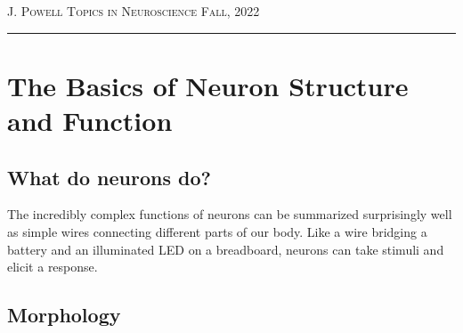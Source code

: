 \documentclass[12pt]{amsart}
\begin{document}
\bigskip
\bigskip
\bigskip
\bigskip
{}

\pagebreak




{\scshape J. Powell} \hfill {\scshape \large Topics in Neuroscience} \hfill {\scshape Fall, 2022}
 
\smallskip

\hrule
\bigskip
\normalsize 

\section{The Basics of Neuron Structure and Function}
\subsection{What do neurons do?} The incredibly complex functions of neurons can be summarized surprisingly well as simple wires connecting different parts of our body. Like a wire bridging a battery and an illuminated LED on a breadboard, neurons can take stimuli and elicit a response. 


\subsection{Morphology}
\end{document}
